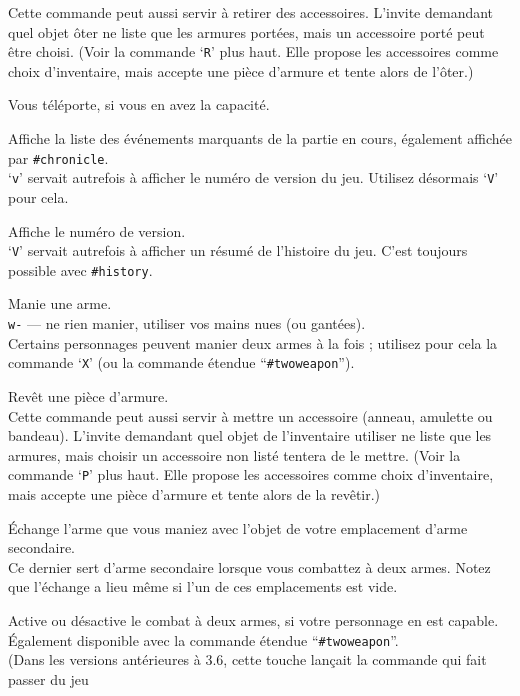 \documentclass[titlepage]{article}
\begin{document}
\begin{description}[font=\mdseries\ttfamily]
Cette commande peut aussi servir à retirer des accessoires.  L'invite
demandant quel objet ôter ne liste que les armures portées, mais un accessoire
porté peut être choisi.
(Voir la commande `\texttt{R}' plus haut.  Elle propose les accessoires comme choix
d'inventaire, mais accepte une pièce d'armure et tente alors de l'ôter.)
\item[\textasciicircum T]
Vous téléporte, si vous en avez la capacité.
\item[v]
Affiche la liste des événements marquants de la partie en cours, également affichée par
\texttt{\#chronicle}.
\\
`\texttt{v}' servait autrefois à afficher le numéro de version du jeu.
Utilisez désormais `\texttt{V}' pour cela.

\item[V]
Affiche le numéro de version.
\\
`\texttt{V}' servait autrefois à afficher un résumé de l'histoire du jeu.
C'est toujours possible avec \texttt{\#history}.
\item[w]
Manie une arme.\\
\texttt{w-} --- ne rien manier, utiliser vos mains nues (ou gantées).\\
Certains personnages peuvent manier deux armes à la fois ; utilisez pour cela la commande `\texttt{X}'
(ou la commande étendue ``\texttt{\#twoweapon}'').
\item[W]
Revêt une pièce d'armure.\\
Cette commande peut aussi servir à mettre un accessoire (anneau, amulette ou
bandeau).  L'invite demandant quel objet de l'inventaire utiliser ne liste que
les armures, mais choisir un accessoire non listé tentera de le mettre.
(Voir la commande `\texttt{P}' plus haut.  Elle propose les accessoires comme choix
d'inventaire, mais accepte une pièce d'armure et tente alors de la revêtir.)
\item[x]
Échange l'arme que vous maniez avec l'objet de votre emplacement d'arme secondaire.\\
Ce dernier sert d'arme secondaire lorsque vous combattez
à deux armes.  Notez que l'échange a lieu même si l'un de ces
emplacements est vide.
\item[X]
Active ou désactive le combat à deux armes, si votre personnage en est capable.  Également disponible
avec la commande étendue ``\texttt{\#twoweapon}''.\\
(Dans les versions antérieures à 3.6, cette touche lançait la commande qui fait passer du jeu

\end{description}
\end{document}

